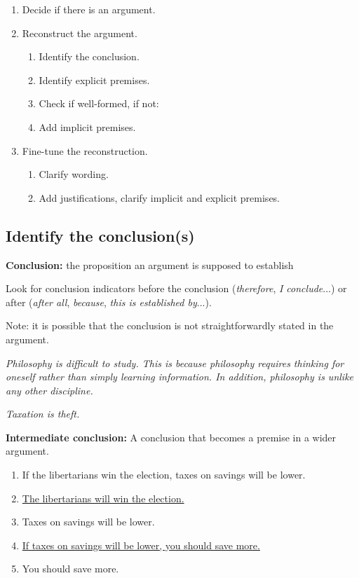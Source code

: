 \begin{enumerate}
    \item Decide if there is an argument.
    \item Reconstruct the argument.
    \begin{enumerate}
        \item Identify the conclusion.
        \item Identify explicit premises.
        \item Check if well-formed, if not:
        \item Add implicit premises.
    \end{enumerate}
    \item Fine-tune the reconstruction.
    \begin{enumerate}
        \item Clarify wording.
        \item Add justifications, clarify implicit and explicit premises.
    \end{enumerate}
\end{enumerate}

\subsection{Identify the conclusion(s)}

\textbf{Conclusion:} the proposition an argument is supposed to establish

Look for conclusion indicators before the conclusion (\textit{therefore},
\textit{I conclude}...) or after (\textit{after all}, \textit{because},
\textit{this is established by}...).

Note: it is possible that the conclusion is not straightforwardly stated
in the argument.

\textit{Philosophy is difficult to study. This is because philosophy
requires thinking for oneself rather than simply learning information.
In addition, philosophy is unlike any other discipline.}

\textit{Taxation is theft.}

\textbf{Intermediate conclusion:} A conclusion that becomes a premise in a
wider argument.

\begin{enumerate}
    \item If the libertarians win the election, taxes on savings will be lower.
    \item \underline{The libertarians will win the election.}
    \item Taxes on savings will be lower.
    \item \underline{If taxes on savings will be lower, you should save more.}
    \item You should save more.
\end{enumerate}

